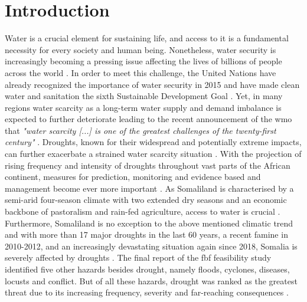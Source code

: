 
\chapter{Introduction} %

\label{Chapter1} 

Water is a crucial element for sustaining life, and access to it is a fundamental necessity for every society and human being. Nonetheless, water security is increasingly becoming a pressing issue affecting the lives of billions of people across the world \autocite{caretta2022water}. In order to meet this challenge, the United Nations have already recognized the importance of water security in 2015 and have made clean water and sanitation the sixth Sustainable Development Goal \autocite{unGoalEnsureAvailability2016}. Yet, in many regions water scarcity as a long-term water supply and demand imbalance is expected to further deteriorate leading to the recent announcement of the \acrlong{wmo} that \textit{"water scarcity [...] is one of the greatest challenges of the twenty-first century"} \autocite[7]{idmpDroughtWaterScarcity2022}.\newline
Droughts, known for their widespread and potentially extreme impacts, can further exacerbate a strained water scarcity situation \autocite{idmpDroughtWaterScarcity2022}. With the projection of rising frequency and intensity of droughts throughout vast parts of the African continent, measures for prediction, monitoring and evidence based  and management become ever more important \autocite{abdulkadirAssessmentDroughtRecurrence2017,trisosAfrica2022,undrrSpecialReportDrought2021}.\newline
As Somaliland is characterised by a semi-arid four-season climate with two extended dry seasons and an economic backbone of pastoralism and rain-fed agriculture, access to water is crucial \autocite{abdulkadirAssessmentDroughtRecurrence2017,petrucciLandscapeLandformsNorthern2022,republicofsomaliaRepublicSomalilandCountry2021}. Furthermore, Somaliland is no exception to the above mentioned climatic trend and with more than 17 major droughts in the last 60 years, a recent famine in 2010-2012, and an increasingly devastating situation again since 2018, Somalia is severely affected by droughts \autocite{abdulkadirAssessmentDroughtRecurrence2017,credEMDATInternationalDisasters2023}. The final report of the \acrfull{fbf} feasibility study identified five other hazards besides drought, namely floods, cyclones, diseases, locusts and conflict. But of all these hazards, drought was ranked as the greatest threat due to its increasing frequency, severity and far-reaching consequences \autocite{scrsFeasibilityStudyPotential2022}.

